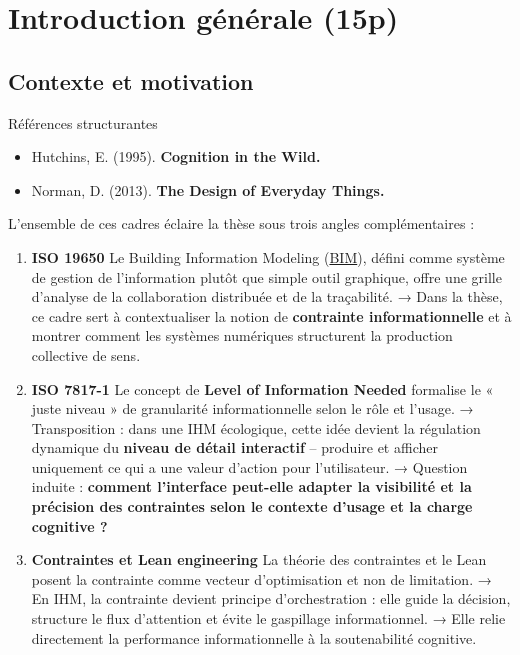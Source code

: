 \documentclass[a4paper,12pt]{article}
\begin{document}
\clearpage

\setcounter{section}{-1}
\section{Introduction générale (15p)}
\label{sec:org346ed2e}
\subsection{Contexte et motivation}
\label{sec:orgf905c8f}
Références structurantes
\begin{itemize}
\item Hutchins, E. (1995). \textbf{Cognition in the Wild.}  \autocite{hutchinsCognitionWild1995}
\item Norman, D. (2013). \textbf{The Design of Everyday Things.} \autocite{normanDesignEverydayThings2013}
\end{itemize}

L’ensemble de ces cadres éclaire la thèse sous trois angles complémentaires :
\begin{enumerate}
\item \textbf{ISO 19650} \autocite{OrganisationNumerisationInformations2018a}  
Le Building Information Modeling
 (\protect\hyperlink{gls-1}{\label{gls-1-use-1}BIM}), défini comme système de gestion de l’information plutôt que simple outil graphique, offre une grille d’analyse de la collaboration distribuée et de la traçabilité.  
→ Dans la thèse, ce cadre sert à contextualiser la notion de \textbf{contrainte informationnelle} et à montrer comment les systèmes numériques structurent la production collective de sens.
\item \textbf{ISO 7817-1} \autocite{ModelisationInformationsConstruction2024} 
Le concept de \textbf{Level of Information Needed} formalise le « juste niveau » de granularité informationnelle selon le rôle et l’usage.  
→ Transposition : dans une IHM écologique, cette idée devient la régulation dynamique du \textbf{niveau de détail interactif} – produire et afficher uniquement ce qui a une valeur d’action pour l’utilisateur.  
→ Question induite : \textbf{comment l’interface peut-elle adapter la visibilité et la précision des contraintes selon le contexte d’usage et la charge cognitive ?}
\item \textbf{Contraintes et Lean engineering}  
La théorie des contraintes \autocite{goldrattGoalProcessOngoing1992} et le Lean \autocite{womackLeanThinkingBanish2003} posent la contrainte comme vecteur d’optimisation et non de limitation.  
→ En IHM, la contrainte devient principe d’orchestration : elle guide la décision, structure le flux d’attention et évite le gaspillage informationnel.  
→ Elle relie directement la performance informationnelle à la soutenabilité cognitive.
\end{enumerate}
\end{document}
